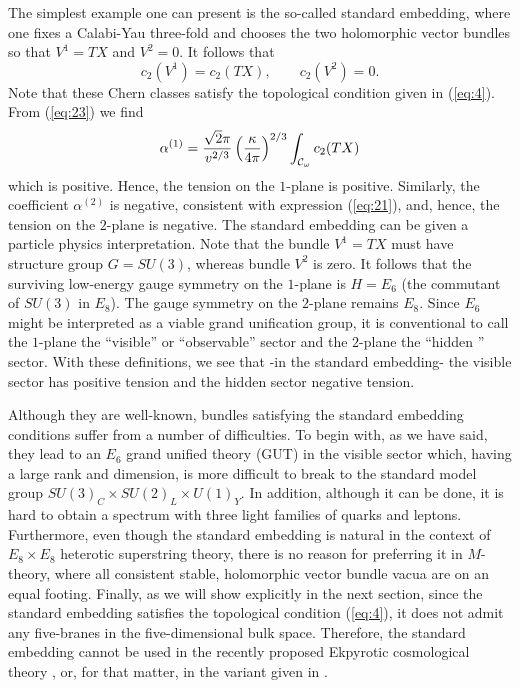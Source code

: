 \documentclass[a4paper,12pt]{article}
\numberwithin{equation}{section}
\theoremstyle{plain}
\begin{document}
The simplest example one can present is the so-called 
standard embedding, where one fixes a Calabi-Yau three-fold and chooses
the two holomorphic vector bundles so that $V^{1}=TX$ and $V^{2}=0$. It
follows that
%
\begin{equation}
c_{2}(V^{1})=c_{2}(TX), \qquad c_{2}(V^{2})=0.
\label{eq:24}
\end{equation}
%
Note that these Chern classes satisfy the topological condition given
in (\ref{eq:4}). From (\ref{eq:23}) we find
%
\begin{equation}
\alpha^{(1)}=\frac{\sqrt{2}\pi}{v^{2/3}}\left(\frac{\kappa}{4\pi}\right)^{2/3}
\int_{{\cal{C}}_{\omega}}{c_{2}(TX)}
\label{eq:25}
\end{equation}
%
which is positive. Hence, the tension on the $1$-plane is positive.
Similarly, the coefficient $\alpha^{(2)}$ is negative, consistent
with expression (\ref{eq:21}), and, hence, the tension on the $2$-plane is
negative. The standard embedding can be given a particle physics
interpretation. Note that the bundle $V^{1}=TX$ must have
structure group $G=SU(3)$, whereas bundle $V^{2}$ is zero. It
follows that the surviving low-energy gauge symmetry on the $1$-plane is
$H=E_{6}$ (the commutant of $SU(3)$ in $E_{8}$). The gauge symmetry on the
$2$-plane remains $E_{8}$. Since $E_{6}$ might be interpreted as a viable
grand unification group, it is conventional to call the $1$-plane the
``visible'' or ``observable'' sector and the $2$-plane the ``hidden '' sector.
With these definitions, we see that  -in the standard embedding- 
the visible sector has positive tension and the hidden sector negative
tension.

Although they are well-known, bundles satisfying the standard embedding
conditions suffer from a number of difficulties. To begin with, as
we have said, they lead to an $E_{6}$ grand unified theory (GUT) in the
visible sector which, having a large rank and dimension, is more difficult to 
break to the standard model group $SU(3)_{C} \times SU(2)_{L} \times U(1)_{Y}$.
In addition, although it can be done, it is hard to obtain a spectrum 
with three light families of 
quarks and leptons. Furthermore, even though the standard embedding is natural 
in the context of $E_{8} \times E_{8}$ heterotic superstring theory, there is
no reason for preferring it in $M$-theory, where all consistent stable, 
holomorphic vector bundle vacua are
on an equal footing. Finally, as we will show explicitly in the next section,
since the standard embedding satisfies the topological condition (\ref{eq:4}),
it does not admit any five-branes in the five-dimensional bulk space. Therefore,
the standard embedding cannot be used in the recently proposed Ekpyrotic 
cosmological theory \cite{EU}, or, for that matter, in the variant given in 
\cite{KKL}.
\end{document}
